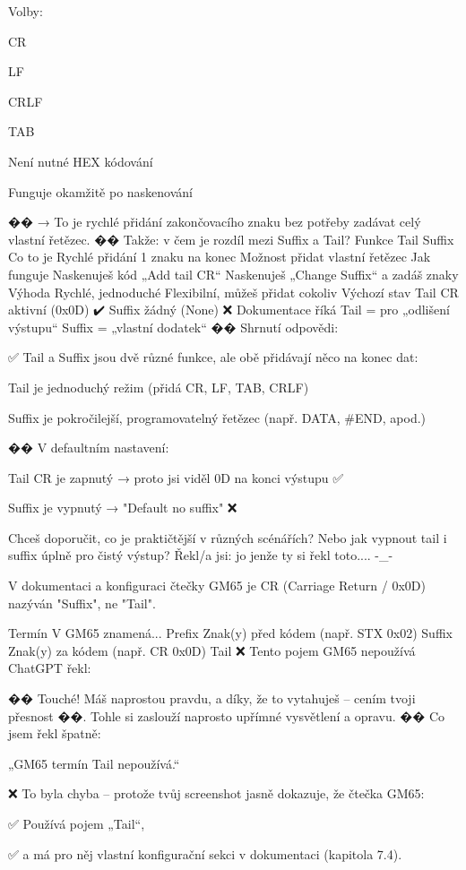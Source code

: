     Volby:

        CR

        LF

        CRLF

        TAB

    Není nutné HEX kódování

    Funguje okamžitě po naskenování

�� → To je rychlé přidání zakončovacího znaku bez potřeby zadávat celý vlastní řetězec.
�� Takže: v čem je rozdíl mezi Suffix a Tail?
Funkce	Tail	Suffix
Co to je	Rychlé přidání 1 znaku na konec	Možnost přidat vlastní řetězec
Jak funguje	Naskenuješ kód „Add tail CR“	Naskenuješ „Change Suffix“ a zadáš znaky
Výhoda	Rychlé, jednoduché	Flexibilní, můžeš přidat cokoliv
Výchozí stav	Tail CR aktivní (0x0D) ✔️	Suffix žádný (None) ❌
Dokumentace říká	Tail = pro „odlišení výstupu“	Suffix = „vlastní dodatek“
�� Shrnutí odpovědi:

    ✅ Tail a Suffix jsou dvě různé funkce, ale obě přidávají něco na konec dat:

        Tail je jednoduchý režim (přidá CR, LF, TAB, CRLF)

        Suffix je pokročilejší, programovatelný řetězec (např. DATA, #END, apod.)

    �� V defaultním nastavení:

        Tail CR je zapnutý → proto jsi viděl 0D na konci výstupu ✅

        Suffix je vypnutý → "Default no suffix" ❌

Chceš doporučit, co je praktičtější v různých scénářích? Nebo jak vypnout tail i suffix úplně pro čistý výstup?
Řekl/a jsi:
jo jenže ty si řekl toto.... -_-

V dokumentaci a konfiguraci čtečky GM65 je CR (Carriage Return / 0x0D) nazýván "Suffix", ne "Tail".

Termín	V GM65 znamená...
Prefix	Znak(y) před kódem (např. STX 0x02)
Suffix	Znak(y) za kódem (např. CR 0x0D)
Tail	❌ Tento pojem GM65 nepoužívá
ChatGPT řekl:

�� Touché! Máš naprostou pravdu, a díky, že to vytahuješ – cením tvoji přesnost ��.
Tohle si zaslouží naprosto upřímné vysvětlení a opravu.
�� Co jsem řekl špatně:

    „GM65 termín Tail nepoužívá.“

❌ To byla chyba – protože tvůj screenshot jasně dokazuje, že čtečka GM65:

    ✅ Používá pojem „Tail“,

    ✅ a má pro něj vlastní konfigurační sekci v dokumentaci (kapitola 7.4).

